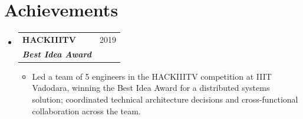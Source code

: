 \documentclass[a4paper,20pt]{article}
\makeatletter
\newcommand{\resumeSubheading}[4]{\vspace{-1pt}\item\begin{tabular*}{0.97\textwidth}{l@{\extracolsep{\fill}}r}\textbf{#1} & #2 \\\textit{#3} & \textit{#4} \\\end{tabular*}\vspace{-5pt}}
\newcommand{\resumeSubHeadingListStart}{\begin{itemize}[leftmargin=*]}
\newcommand{\resumeSubHeadingListEnd}{\end{itemize}}
\makeatother
\begin{document}
\vspace{-5pt}

\section{Achievements}
  \resumeSubHeadingListStart
    \resumeSubheading{HACKIIITV}{2019}{\textbf{Best Idea Award}}{}
      \begin{itemize}
        \item{Led a team of 5 engineers in the HACKIIITV competition at IIIT Vadodara, winning the Best Idea Award for a distributed systems solution; coordinated technical architecture decisions and cross-functional collaboration across the team.}
      \end{itemize}
  \resumeSubHeadingListEnd
\end{document}
